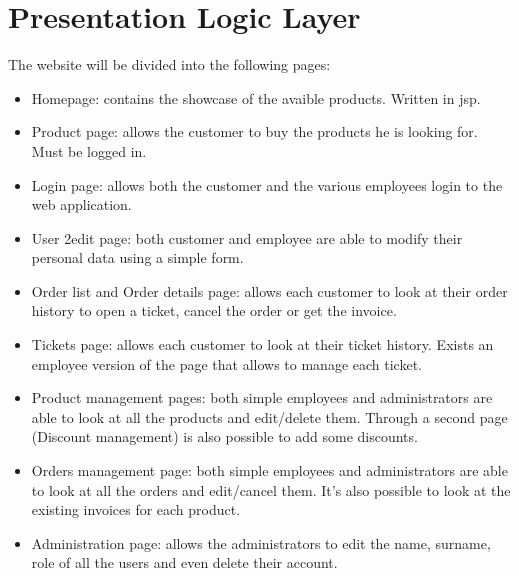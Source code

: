 \section{Presentation Logic Layer}


The website will be divided into the following pages:
\begin{itemize}
    \item Homepage: contains the showcase of the avaible products. Written in jsp.
    \item Product page: allows the customer to buy the products he is looking for. Must be logged in.
    \item Login page: allows both the customer and the various employees login to the web application. 
    \item User 2edit page: both customer and employee are able to modify their personal data using a simple form. 
    \item Order list and Order details page: allows each customer to look at their order history to open a ticket, cancel the order or get the invoice.
    \item Tickets page: allows each customer to look at their ticket history. Exists an employee version of the page that allows to manage each ticket.
    \item Product management pages: both simple employees and administrators are able to look at all the products and edit/delete them. Through a second page (Discount management) is also possible to add some discounts.
    \item Orders management page: both simple employees and administrators are able to look at all the orders and edit/cancel them. It's also possible to look at the existing invoices for each product.
    \item Administration page: allows the administrators to edit the name, surname, role of all the users and even delete their account.
\end{itemize}

